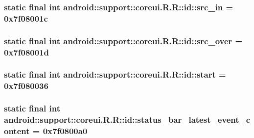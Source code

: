 \hypertarget{classandroid_1_1support_1_1coreui_1_1_r_1_1id_e29e81a4f9c4d0c8f34ef40e061e2200}{
\subsubsection[{src\_\-in}]{\setlength{\rightskip}{0pt plus 5cm}static final int android::support::coreui.R.R::id::src\_\-in = 0x7f08001c}}
\label{classandroid_1_1support_1_1coreui_1_1_r_1_1id_e29e81a4f9c4d0c8f34ef40e061e2200}


\hypertarget{classandroid_1_1support_1_1coreui_1_1_r_1_1id_da6416dac5d4527a0353206308bf7fa4}{
\subsubsection[{src\_\-over}]{\setlength{\rightskip}{0pt plus 5cm}static final int android::support::coreui.R.R::id::src\_\-over = 0x7f08001d}}
\label{classandroid_1_1support_1_1coreui_1_1_r_1_1id_da6416dac5d4527a0353206308bf7fa4}


\hypertarget{classandroid_1_1support_1_1coreui_1_1_r_1_1id_244db99650c9bbbde8faed2be318ce0c}{
\subsubsection[{start}]{\setlength{\rightskip}{0pt plus 5cm}static final int android::support::coreui.R.R::id::start = 0x7f080036}}
\label{classandroid_1_1support_1_1coreui_1_1_r_1_1id_244db99650c9bbbde8faed2be318ce0c}


\hypertarget{classandroid_1_1support_1_1coreui_1_1_r_1_1id_cbbc49b6b1bc4f7e316ff4bd0c1d9f3b}{
\subsubsection[{status\_\-bar\_\-latest\_\-event\_\-content}]{\setlength{\rightskip}{0pt plus 5cm}static final int android::support::coreui.R.R::id::status\_\-bar\_\-latest\_\-event\_\-content = 0x7f0800a0}}
\label{classandroid_1_1support_1_1coreui_1_1_r_1_1id_cbbc49b6b1bc4f7e316ff4bd0c1d9f3b}


